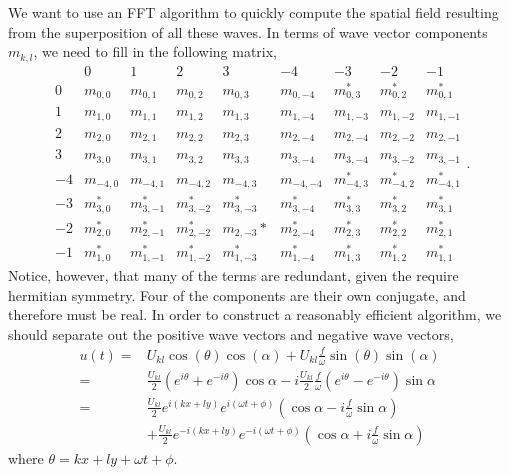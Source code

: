 \documentclass[11pt]{amsart}
\begin{document}
We want to use an FFT algorithm to quickly compute the spatial field resulting from the superposition of all these waves. In terms of wave vector components $m_{k,l}$, we need to fill in the following matrix,
\begin{equation}
\begin{array}{c|cccccccc} & 0 & 1 & 2 & 3 & -4 & -3 & -2 & -1 \\ \hline 0 & m_{0,0} & m_{0,1} & m_{0,2} & m_{0,3} & m_{0,-4} & m_{0,3}^\ast & m_{0,2}^\ast & m_{0,1}^\ast \\1 & m_{1,0} & m_{1,1} & m_{1,2} & m_{1,3} & m_{1,-4} & m_{1,-3} & m_{1,-2} & m_{1,-1} \\2 & m_{2,0} & m_{2,1} & m_{2,2} & m_{2,3} & m_{2,-4} & m_{2,-4} & m_{2,-2} & m_{2,-1} \\3 & m_{3,0} & m_{3,1} & m_{3,2} & m_{3,3} & m_{3,-4} & m_{3,-4} & m_{3,-2} & m_{3,-1} \\-4 & m_{-4,0} & m_{-4,1} & m_{-4,2} & m_{-4,3} & m_{-4,-4} & m_{-4,3}^\ast & m_{-4,2}^\ast & m_{-4,1}^\ast \\-3 & m_{3,0}^\ast & m_{3,-1}^\ast & m_{3,-2}^\ast & m_{3,-3}^\ast & m_{3,-4}^\ast & m_{3,3}^\ast & m_{3,2}^\ast & m_{3,1}^\ast \\-2 & m_{2,0}^\ast & m_{2,-1}^\ast & m_{2,-2}^\ast & m_{2,-3}\ast & m_{2,-4}^\ast & m_{2,3}^\ast & m_{2,2}^\ast & m_{2,1}^\ast \\-1 & m_{1,0}^\ast & m_{1,-1}^\ast & m_{1,-2}^\ast & m_{1,-3}^\ast & m_{1,-4}^\ast & m_{1,3}^\ast & m_{1,2}^\ast & m_{1,1}^\ast\end{array}.
\end{equation}
Notice, however, that many of the terms are redundant, given the require hermitian symmetry. Four of the components are their own conjugate, and therefore must be real. In order to construct a reasonably efficient algorithm, we should separate out the positive wave vectors and negative wave vectors,
\begin{align}
u(t) =& U_{kl} \cos( \theta ) \cos( \alpha) + U_{kl} \frac{f}{\omega} \sin( \theta ) \sin(\alpha) \\
=& \frac{U_{kl}}{2} \left( e^{i\theta} + e^{-i \theta} \right) \cos \alpha - i \frac{U_{kl}}{2} \frac{f}{\omega} \left( e^{i \theta} - e^{-i\theta} \right) \sin \alpha \\
=& \frac{U_{kl}}{2} e^{i(kx+ly)} e^{i(\omega t + \phi)} \left( \cos \alpha - i \frac{f}{\omega} \sin \alpha \right)  \\ \nonumber
&+ \frac{U_{kl}}{2} e^{-i(kx+ly)} e^{-i(\omega t + \phi)} \left( \cos \alpha + i \frac{f}{\omega} \sin \alpha \right) 
\end{align}
where $\theta = kx + ly + \omega t + \phi$.
\end{document}
